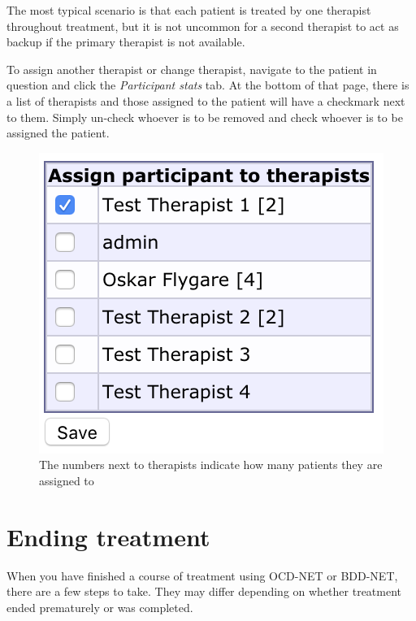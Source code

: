 \documentclass[]{book}
\begin{document}
The most typical scenario is that each patient is treated by one therapist throughout treatment, but it is not uncommon for a second therapist to act as backup if the primary therapist is not available.

To assign another therapist or change therapist, navigate to the patient in question and click the \emph{Participant stats} tab. At the bottom of that page, there is a list of therapists and those assigned to the patient will have a checkmark next to them. Simply un-check whoever is to be removed and check whoever is to be assigned the patient.

\begin{figure}
\centering
\includegraphics{images/assign-therapist.png}
\caption{The numbers next to therapists indicate how many patients they are assigned to}
\end{figure}

\hypertarget{ending-treatment}{%
\section{Ending treatment}\label{ending-treatment}}

When you have finished a course of treatment using OCD-NET or BDD-NET, there are a few steps to take. They may differ depending on whether treatment ended prematurely or was completed.
\end{document}
